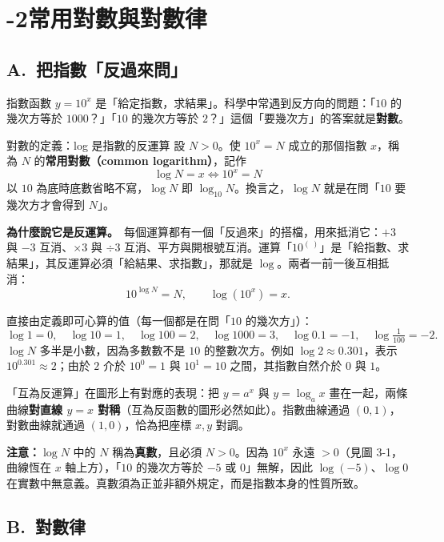 \documentclass[11pt]{article}
\begin{document}
\section*{-2\quad 常用對數與對數律}

\subsection*{\sffamily A.\ 把指數「反過來問」}

指數函數 $y=10^x$ 是「給定指數，求結果」。科學中常遇到反方向的問題：「$10$ 的幾次方等於 $1000$？」「$10$ 的幾次方等於 $2$？」這個「要幾次方」的答案就是\textbf{對數}。

\begin{補充框}{對數的定義：log 是指數的反運算}
設 $N>0$。使 $10^x=N$ 成立的那個指數 $x$，稱為 $N$ 的\textbf{常用對數（common logarithm）}，記作
$$\boxed{\,\log N=x \iff 10^{x}=N\,}$$
以 $10$ 為底時底數省略不寫，$\log N$ 即 $\log_{10}N$。換言之，$\log N$ 就是在問「$10$ 要幾次方才會得到 $N$」。

\textbf{為什麼說它是反運算。}\ 每個運算都有一個「反過來」的搭檔，用來抵消它：$+3$ 與 $-3$ 互消、$\times3$ 與 $\div3$ 互消、平方與開根號互消。運算「$10^{(\ )}$」是「給指數、求結果」，其反運算必須「給結果、求指數」，那就是 $\log$。兩者一前一後互相抵消：
$$10^{\log N}=N,\qquad \log(10^x)=x.$$

直接由定義即可心算的值（每一個都是在問「$10$ 的幾次方」）：
$$\log 1=0,\quad \log 10=1,\quad \log 100=2,\quad \log 1000=3,\quad \log 0.1=-1,\quad \log\tfrac{1}{100}=-2.$$
$\log N$ 多半是小數，因為多數數不是 $10$ 的整數次方。例如 $\log2\approx0.301$，表示 $10^{0.301}\approx2$；由於 $2$ 介於 $10^0=1$ 與 $10^1=10$ 之間，其指數自然介於 $0$ 與 $1$。
\end{補充框}

「互為反運算」在圖形上有對應的表現：把 $y=a^x$ 與 $y=\log_a x$ 畫在一起，兩條曲線\textbf{對直線 $y=x$ 對稱}（互為反函數的圖形必然如此）。指數曲線通過 $(0,1)$，對數曲線就通過 $(1,0)$，恰為把座標 $x,y$ 對調。


\textbf{注意：}$\log N$ 中的 $N$ 稱為\textbf{真數}，且必須 $N>0$。因為 $10^x$ 永遠 $>0$（見圖 3-1，曲線恆在 $x$ 軸上方），「$10$ 的幾次方等於 $-5$ 或 $0$」無解，因此 $\log(-5)$、$\log 0$ 在實數中無意義。真數須為正並非額外規定，而是指數本身的性質所致。

\subsection*{\sffamily B.\ 對數律}
\end{document}
